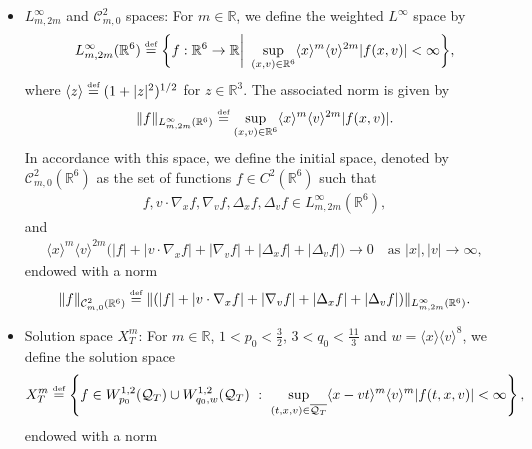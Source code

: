 \documentclass[reqno,11pt,final]{amsart}
\theoremstyle{plain}
\numberwithin{equation}{section}
\numberwithin{theorem}{section}
\newcommand{\eqdef }{\overset{\mbox{\tiny{def}}}{=}}
\begin{document}
\begin{itemize}
\begin{align*}
W_{p,q}^{1,2}(\Omega_T) \eqdef W_{p,q,1}^{1,2}(\Omega_T),\ \ W_p^{1,2}(\Omega_T) \eqdef W_{p,p,1}^{1,2}(\Omega_T),
\end{align*}where the weight is identically one, and the mixed norm reduces to the standard $L^p$-based parabolic Sobolev norm.
\item $L^\infty_{m,2m}$ and $\mathcal{C}^2_{m,0}$ spaces: For $m\in\mathbb{R}$, we define the weighted $L^\infty$ space by
\begin{align*}
    L^\infty_{m,2m}(\mathbb{R}^6) \eqdef \biggl\{f : \mathbb{R}^6\to\mathbb{R} \bigg|\ \sup_{(x,v)\in\mathbb{R}^6}\langle x\rangle^m \langle v\rangle^{2m}|f(x,v)|<\infty\biggr\},
\end{align*}where $\langle z\rangle \eqdef (1+|z|^2)^{1/2}$ for $z\in\mathbb{R}^3$. The associated norm is given by
\begin{align*}
    \lVert f\rVert_{L^\infty_{m,2m}(\mathbb{R}^6)} \eqdef \sup_{(x,v)\in\mathbb{R}^6} \langle x\rangle^m\langle v\rangle^{2m} |f(x,v)|.
\end{align*}In accordance with this space, we define the initial space, denoted by $\mathcal{C}^2_{m,0}(\mathbb{R}^6)$ as the set of functions $f\in C^2(\mathbb{R}^6)$ such that
\begin{align*}
    f,v\cdot\nabla_xf, \nabla_vf, \Delta_xf, \Delta_vf\in L^\infty_{m,2m}(\mathbb{R}^6),
\end{align*}and
\begin{align*}
    \langle x\rangle^m\langle v\rangle^{2m}\big(|f|+|v\cdot\nabla_xf| + |\nabla_vf| + |\Delta_xf| + |\Delta_vf|\big) \to0 \quad\text{as }|x|,|v|\to\infty,
\end{align*}endowed with a norm
\begin{align*}
    \|f\|_{\mathcal{C}^2_{m,0}(\mathbb{R}^6)} \eqdef \|(|f| +|v\cdot\nabla_xf|+ |\nabla_vf| + |\Delta_xf| + |\Delta_vf|)\|_{L^\infty_{m,2m}(\mathbb{R}^6)}. 
\end{align*}
\item Solution space $X_T^m$: For $m\in\mathbb{R}$, $1<p_0<\frac{3}{2}$, $3<q_0<\frac{11}{3}$ and $w=\langle x\rangle\langle v\rangle^8$, we define the solution space 
    \begin{align*}
            X_T^m  \eqdef \left\{f \in W_{p_0}^{1,2}(\mathcal{Q}_T)\cup W_{q_0,w}^{1,2}(\mathcal{Q}_T) \ :\  \sup_{(t,x,v)\in \overline{\mathcal{Q}_T}} \langle x-vt\rangle^m\langle v\rangle^m|f(t,x,v)|<\infty\right\},
    \end{align*}endowed with a norm
    \begin{align*}

\end{align*}
\end{itemize}
\end{document}
